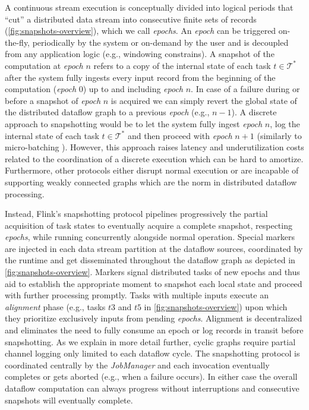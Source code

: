 A continuous stream execution is conceptually divided into logical periods that ``cut'' a distributed data stream into consecutive finite sets of records (\autoref{fig:snapshots-overview}), which we call \emph{epochs}. An \emph{epoch} can be triggered on-the-fly, periodically by the system or on-demand by the user and is decoupled from any application logic (e.g., windowing constrains). A snapshot of the computation at \emph{epoch} $n$ refers to a copy of the internal state of each task $t \in \mathcal{T^*}$ after the system fully ingests every input record from the beginning of the computation (\emph{epoch} 0) up to and including \emph{epoch} $n$. In case of a failure during or before a snapshot of \emph{epoch} $n$ is acquired we can simply revert the global state of the distributed dataflow graph to a previous \emph{epoch} (e.g., $n-1$). A discrete approach to snapshotting would be to let the system fully ingest \emph{epoch} $n$, log the internal state of each task $t \in \mathcal{T^*}$ and then proceed with \emph{epoch} $n+1$ (similarly to micro-batching \cite{zaharia2012discretized}). However, this approach raises latency and underutilization costs related to the coordination of a discrete execution which can be hard to amortize. Furthermore, other protocols either disrupt normal execution \cite{murray2013naiad,jacques2016consistent} or are incapable of supporting weakly connected graphs \cite{chandy1985distributed} which are the norm in distributed dataflow processing.

Instead, Flink's snapshotting protocol pipelines progressively the partial acquisition of task states to eventually acquire a complete snapshot, respecting \emph{epochs}, while running concurrently alongside normal operation. Special markers are injected in each data stream partition at the dataflow sources, coordinated by the runtime and get disseminated throughout the dataflow graph as depicted in \autoref{fig:snapshots-overview}. Markers signal distributed tasks of new epochs and thus aid to establish the appropriate moment to snapshot each local state and proceed with further processing promptly. Tasks with multiple inputs execute an \emph{alignment} phase (e.g., tasks $t3$ and $t5$ in \autoref{fig:snapshots-overview}) upon which they prioritize exclusively inputs from pending \emph{epochs}. Alignment is decentralized and eliminates the need to fully consume an epoch or log records in transit before snapshotting. As we explain in more detail further, cyclic graphs require partial channel logging only limited to each dataflow cycle. The snapshotting protocol is coordinated centrally by the \emph{JobManager} and each invocation eventually completes or gets aborted (e.g., when a failure occurs). In either case the overall dataflow computation can always progress without interruptions and consecutive snapshots will eventually complete.

